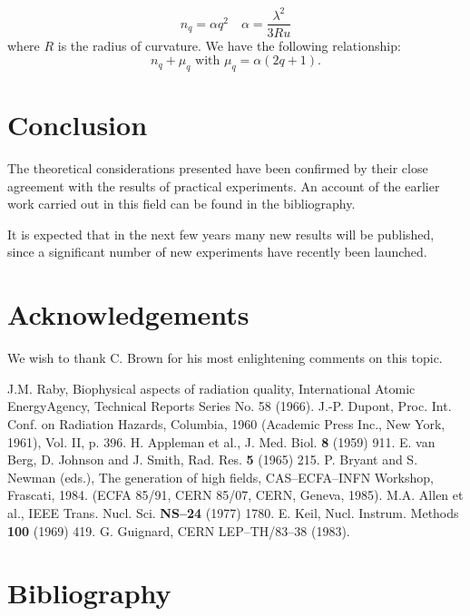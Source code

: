 \documentclass{cernphprep}
\begin{document}
\begin{equation}
n_q = \alpha q^2 \quad \alpha=\frac{\lambda^2}{3 Ru} \label{eq:a3}  
\end{equation}
where $R$ is the radius of curvature. We have the following 
relationship:
\begin{equation}
n_q + \mu_q \text{ with } \mu_q = \alpha (2q + 1).   \label{eq:a4}  
\end{equation}

\section{Conclusion}

The theoretical considerations presented have been confirmed 
by their close agreement with the results of practical experiments. 
An account of the earlier work carried out in this field can 
be found in the bibliography.

It is expected that in the next few years many new results will 
be published, since a significant number of new experiments have 
recently been launched.

\section*{Acknowledgements}

We wish to thank C. Brown for his most enlightening comments 
on this topic.

\begin{thebibliography}{99}
  J.M. Raby, Biophysical aspects of radiation quality, International 
  Atomic EnergyAgency, Technical Reports Series No. 58 (1966).
  J.-P. Dupont, Proc. Int. Conf. on Radiation Hazards, Columbia, 
  1960 (Academic Press Inc., New York, 1961), Vol. II, p. 396.
  H. Appleman et al., J. Med. Biol. \textbf{8} (1959) 911.
  E. van Berg, D. Johnson and J. Smith, Rad. Res. \textbf{5} (1965) 
  215.
  P. Bryant and S. Newman (eds.), The generation of high fields, 
  CAS--ECFA--INFN Workshop, Frascati, 1984. (ECFA 85/91, CERN 85/07, 
  CERN, Geneva, 1985).
  M.A. Allen et al., IEEE Trans. Nucl. Sci. \textbf{NS--24} (1977) 
  1780.
  E. Keil, Nucl. Instrum. Methods \textbf{100} (1969) 419.
  G. Guignard, CERN LEP--TH/83--38 (1983).
\end{thebibliography}

\section*{Bibliography}
\end{document}
